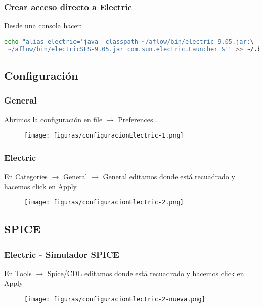 \documentclass{beamer}
\begin{document}
\begin{frame}[fragile]
\frametitle{Crear acceso directo a Electric}
Desde una consola hacer:
\begin{tiny}
\begin{lstlisting}[language=bash]
 echo "alias electric='java -classpath ~/aflow/bin/electric-9.05.jar:\
 ~/aflow/bin/electricSFS-9.05.jar com.sun.electric.Launcher &'" >> ~/.bashrc
\end{lstlisting}

\end{tiny}

\end{frame}

\begin{frame}[fragile]
\section{Configuración}
\frametitle{General}

\noindent Abrimos la configuración en file $\rightarrow$ Preferences...

\begin{figure}
\texttt{[image: figuras/configuracionElectric-1.png]}
\end{figure}
\end{frame}


\begin{frame}
\frametitle{Electric}

\noindent En Categories $\rightarrow$ General $\rightarrow$ General editamos donde está recuadrado y hacemos click en Apply 

\begin{figure}
\texttt{[image: figuras/configuracionElectric-2.png]}
\end{figure}
\end{frame}

\begin{frame}[fragile]
\subsection{SPICE}
\frametitle{Electric - Simulador SPICE}

\noindent En Tools $\rightarrow$ Spice/CDL editamos donde está recuadrado y hacemos click en Apply 

\begin{figure}
\texttt{[image: figuras/configuracionElectric-2-nueva.png]}
\end{figure}
\end{frame}
\end{document}
